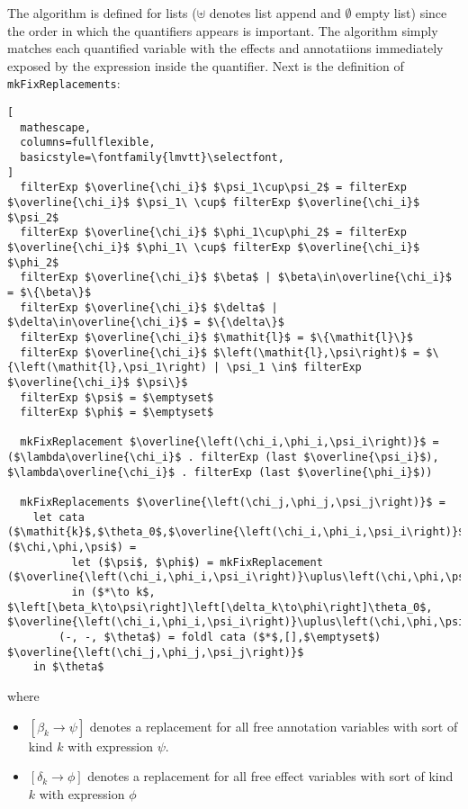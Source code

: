 \documentclass[8pt]{extarticle}
\begin{document}
The algorithm is defined for lists ($\uplus$ denotes list append and $\emptyset$ empty list) since the order in which the quantifiers appears is important. The algorithm simply matches each quantified variable with the effects and annotatiions immediately exposed by the expression inside the quantifier. Next is the definition of \verb+mkFixReplacements+:
\begin{lstlisting}[
  mathescape,
  columns=fullflexible,
  basicstyle=\fontfamily{lmvtt}\selectfont,
]
  filterExp $\overline{\chi_i}$ $\psi_1\cup\psi_2$ = filterExp $\overline{\chi_i}$ $\psi_1\ \cup$ filterExp $\overline{\chi_i}$ $\psi_2$
  filterExp $\overline{\chi_i}$ $\phi_1\cup\phi_2$ = filterExp $\overline{\chi_i}$ $\phi_1\ \cup$ filterExp $\overline{\chi_i}$ $\phi_2$
  filterExp $\overline{\chi_i}$ $\beta$ | $\beta\in\overline{\chi_i}$ = $\{\beta\}$
  filterExp $\overline{\chi_i}$ $\delta$ | $\delta\in\overline{\chi_i}$ = $\{\delta\}$
  filterExp $\overline{\chi_i}$ $\mathit{l}$ = $\{\mathit{l}\}$
  filterExp $\overline{\chi_i}$ $\left(\mathit{l},\psi\right)$ = $\{\left(\mathit{l},\psi_1\right) | \psi_1 \in$ filterExp $\overline{\chi_i}$ $\psi\}$
  filterExp $\psi$ = $\emptyset$
  filterExp $\phi$ = $\emptyset$

  mkFixReplacement $\overline{\left(\chi_i,\phi_i,\psi_i\right)}$ = ($\lambda\overline{\chi_i}$ . filterExp (last $\overline{\psi_i}$), $\lambda\overline{\chi_i}$ . filterExp (last $\overline{\phi_i}$))

  mkFixReplacements $\overline{\left(\chi_j,\phi_j,\psi_j\right)}$ = 
    let cata ($\mathit{k}$,$\theta_0$,$\overline{\left(\chi_i,\phi_i,\psi_i\right)}$) ($\chi,\phi,\psi$) =
          let ($\psi$, $\phi$) = mkFixReplacement ($\overline{\left(\chi_i,\phi_i,\psi_i\right)}\uplus\left(\chi,\phi,\psi\right)$) 
          in ($*\to k$, $\left[\beta_k\to\psi\right]\left[\delta_k\to\phi\right]\theta_0$, $\overline{\left(\chi_i,\phi_i,\psi_i\right)}\uplus\left(\chi,\phi,\psi\right)$)
        (-, -, $\theta$) = foldl cata ($*$,[],$\emptyset$) $\overline{\left(\chi_j,\phi_j,\psi_j\right)}$
    in $\theta$
\end{lstlisting}
where
\begin{itemize}
\item $\left[\beta_k\to\psi\right]$ denotes a replacement for all free annotation variables with sort of kind $k$ with expression $\psi$.
\item $\left[\delta_k\to\phi\right]$  denotes a replacement for all free effect variables with sort of kind $k$ with expression $\phi$
\end{itemize}
\end{document}
